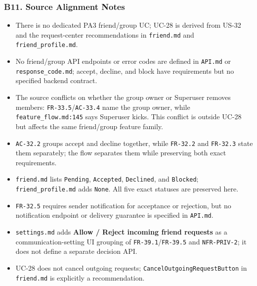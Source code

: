 \documentclass[12pt]{article}
\begin{document}
\hypertarget{sec:b11-source-alignment-notes}{}
\subsubsection*{B11. Source Alignment Notes}
\par\medskip

\begin{itemize}
\item There is no dedicated PA3 friend/group UC; UC-28 is derived from US-32 and the request-center recommendations in \texttt{friend.md} and \texttt{friend\_profile.md}.
\item No friend/group API endpoints or error codes are defined in \texttt{API.md} or \texttt{response\_code.md}; accept, decline, and block have requirements but no specified backend contract.
\item The source conflicts on whether the group owner or Superuser removes members: \texttt{FR-33.5}/\texttt{AC-33.4} name the group owner, while \texttt{feature\_flow.md:145} says Superuser kicks. This conflict is outside UC-28 but affects the same friend/group feature family.
\item \texttt{AC-32.2} groups accept and decline together, while \texttt{FR-32.2} and \texttt{FR-32.3} state them separately; the flow separates them while preserving both exact requirements.
\item \texttt{friend.md} lists \texttt{Pending}, \texttt{Accepted}, \texttt{Declined}, and \texttt{Blocked}; \texttt{friend\_profile.md} adds \texttt{None}. All five exact statuses are preserved here.
\item \texttt{FR-32.5} requires sender notification for acceptance or rejection, but no notification endpoint or delivery guarantee is specified in \texttt{API.md}.
\item \texttt{settings.md} adds \textbf{Allow / Reject incoming friend requests} as a communication-setting UI grouping of \texttt{FR-39.1}/\texttt{FR-39.5} and \texttt{NFR-PRIV-2}; it does not define a separate decision API.
\item UC-28 does not cancel outgoing requests; \texttt{CancelOutgoingRequestButton} in \texttt{friend.md} is explicitly a recommendation.
\end{itemize}
\par\medskip

\par\medskip
\hypertarget{sec:ui-prototype-specimens}{}
\end{document}

